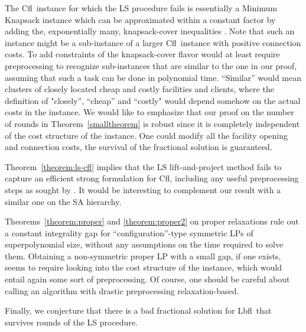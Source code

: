 \documentclass[11pt]{article}\usepackage{amsmath}
\newcommand{\lbfl}{{\sc Lbfl}}
\newcommand{\cfl}{{\sc Cfl}}
\begin{document}
The \cfl\ instance for which  the LS procedure fails is essentially a
 Minimum Knapsack instance which can be approximated within a constant
 factor by adding the, exponentially many, knapsack-cover inequalities
 \cite{CarrFLP00}. Note that such  an instance might be a sub-instance
 of a  larger \cfl\ instance  with positive connection costs.   To add
 constraints  of  the knapsack-cover  flavor  would  at least  require
 preprocessing to recognize sub-instances  that are similar to the one
 in our  proof, assuming that  such a task  can be done  in polynomial
 time.  ``Similar''  would mean clusters of closely  located cheap and
 costly facilities  and clients,  where the definition  of "closely'',
 ``cheap'' and ``costly"  would depend somehow on the  actual costs in
 the instance. We would like to emphasize that our proof on the number
 of  rounds  in  Theorem~\ref{smalltheorem}  is  robust  since  it  is
 completely  independent of the  cost structure  of the  instance. One
 could modify all the facility opening and connection costs,
the survival  of the
  fractional solution  is guaranteed.


 Theorem~\ref{theorem:ls-cfl} implies that the LS lift-and-project method
 fails to capture an efficient strong formulation for \cfl, 
including any useful preprocessing steps as sought by \cite{AnBS13}. 
It would be interesting to complement our  result with a similar one
on the SA hierarchy.

\iffalse ---------------- Ruling out exponential-sized LPs that can be
solved efficiently  or can be  used for analysis without  solving them
(e.g.,  through the  primal-dual method)  is a  much  more challenging
task.  Towards that direction ---- \fi 

Theorems~\ref{theorem:proper}
and \ref{theorem:proper2} on proper relaxations rule out a constant
integrality gap for ``configuration''-type symmetric LPs of
superpolynomial size, without any  assumptions on the time required to
solve them.  Obtaining a non-symmetric proper LP with a small
gap, if one  exists, seems to require looking  into the cost structure
of the instance, which would entail again some sort of preprocessing.
Of course, one should be careful about calling an algorithm with 
 drastic preprocessing    relaxation-based. 


Finally, we conjecture that there is a bad fractional solution for
\lbfl\  that  survives   rounds  of  the  LS
procedure.
\end{document}
